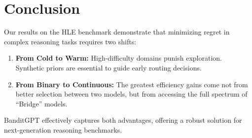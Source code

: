 \documentclass[sigconf]{acmart}
\begin{document}
\section{Conclusion}
Our results on the HLE benchmark demonstrate that minimizing regret in complex reasoning tasks requires two shifts:
\begin{enumerate}
    \item \textbf{From Cold to Warm:} High-difficulty domains punish exploration. Synthetic priors are essential to guide early routing decisions.
    \item \textbf{From Binary to Continuous:} The greatest efficiency gains come not from better selection between two models, but from accessing the full spectrum of ``Bridge'' models.
\end{enumerate}

BanditGPT effectively captures both advantages, offering a robust solution for next-generation reasoning benchmarks.
\end{document}
